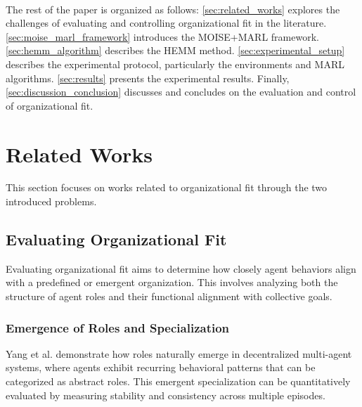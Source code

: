\documentclass[sigconf,anonymous]{aamas}
\begin{document}
\

The rest of the paper is organized as follows: \autoref{sec:related_works} explores the challenges of evaluating and controlling organizational fit in the literature. \autoref{sec:moise_marl_framework} introduces the MOISE+MARL framework. \autoref{sec:hemm_algorithm} describes the HEMM method. \autoref{sec:experimental_setup} describes the experimental protocol, particularly the environments and MARL algorithms. \autoref{sec:results} presents the experimental results. Finally, \autoref{sec:discussion_conclusion} discusses and concludes on the evaluation and control of organizational fit.

\section{Related Works}
\label{sec:related_works}

This section focuses on works related to organizational fit through the two introduced problems.


\subsection{Evaluating Organizational Fit}
Evaluating organizational fit aims to determine how closely agent behaviors align with a predefined or emergent organization. This involves analyzing both the structure of agent roles and their functional alignment with collective goals.

\subsubsection{Emergence of Roles and Specialization}
Yang et al. \cite{yang2021role} demonstrate how roles naturally emerge in decentralized multi-agent systems, where agents exhibit recurring behavioral patterns that can be categorized as abstract roles. This emergent specialization can be quantitatively evaluated by measuring stability and consistency across multiple episodes.
\end{document}
